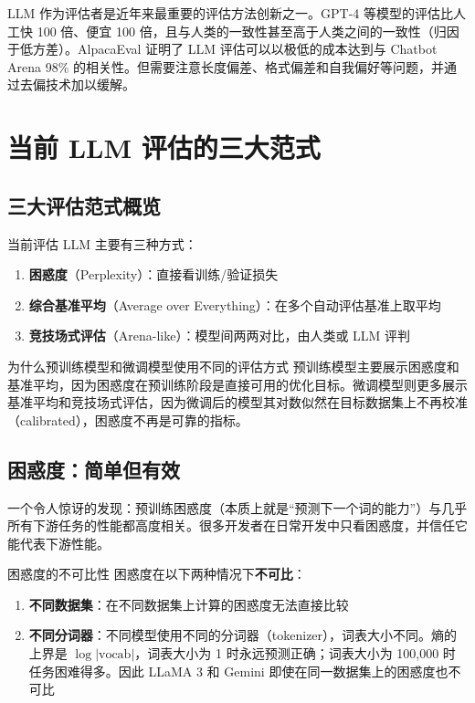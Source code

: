 \documentclass[a4paper]{article}
\begin{document}
LLM 作为评估者是近年来最重要的评估方法创新之一。GPT-4 等模型的评估比人工快 100 倍、便宜 100 倍，且与人类的一致性甚至高于人类之间的一致性（归因于低方差）。AlpacaEval 证明了 LLM 评估可以以极低的成本达到与 Chatbot Arena 98\% 的相关性。但需要注意长度偏差、格式偏差和自我偏好等问题，并通过去偏技术加以缓解。


\section{当前 LLM 评估的三大范式}

\subsection{三大评估范式概览}

当前评估 LLM 主要有三种方式：

\begin{enumerate}
    \item \textbf{困惑度}（Perplexity）：直接看训练/验证损失
    \item \textbf{综合基准平均}（Average over Everything）：在多个自动评估基准上取平均
    \item \textbf{竞技场式评估}（Arena-like）：模型间两两对比，由人类或 LLM 评判
\end{enumerate}





\begin{knowledgebox}{为什么预训练模型和微调模型使用不同的评估方式}
预训练模型主要展示困惑度和基准平均，因为困惑度在预训练阶段是直接可用的优化目标。微调模型则更多展示基准平均和竞技场式评估，因为微调后的模型其对数似然在目标数据集上不再校准（calibrated），困惑度不再是可靠的指标。
\end{knowledgebox}

\subsection{困惑度：简单但有效}





一个令人惊讶的发现：预训练困惑度（本质上就是``预测下一个词的能力''）与几乎所有下游任务的性能都高度相关。很多开发者在日常开发中只看困惑度，并信任它能代表下游性能。

\begin{warningbox}{困惑度的不可比性}
困惑度在以下两种情况下\textbf{不可比}：
\begin{enumerate}
    \item \textbf{不同数据集}：在不同数据集上计算的困惑度无法直接比较
    \item \textbf{不同分词器}：不同模型使用不同的分词器（tokenizer），词表大小不同。熵的上界是 $\log|\text{vocab}|$，词表大小为 1 时永远预测正确；词表大小为 100,000 时任务困难得多。因此 LLaMA 3 和 Gemini 即使在同一数据集上的困惑度也不可比
\end{enumerate}
\end{warningbox}
\end{document}
